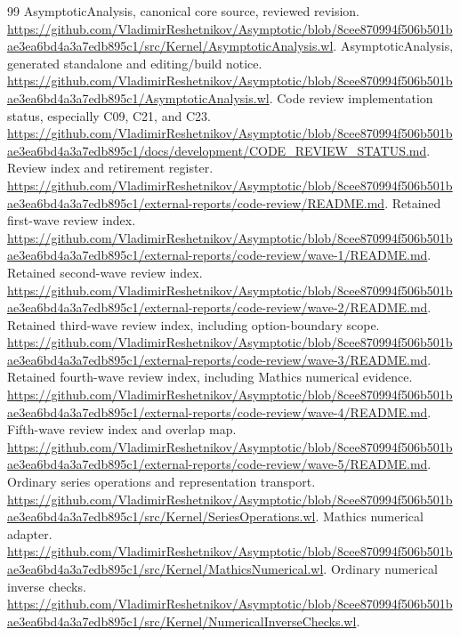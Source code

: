 \documentclass[11pt,letterpaper]{article}
\begin{document}
\begingroup
\small
\raggedright
\def\repoURL{https://github.com/VladimirReshetnikov/Asymptotic/blob/8cee870994f506b501bae3ea6bd4a3a7edb895c1/}
\begin{thebibliography}{99}
 AsymptoticAnalysis, canonical core source, reviewed revision. \url{https://github.com/VladimirReshetnikov/Asymptotic/blob/8cee870994f506b501bae3ea6bd4a3a7edb895c1/src/Kernel/AsymptoticAnalysis.wl}.
 AsymptoticAnalysis, generated standalone and editing/build notice. \url{https://github.com/VladimirReshetnikov/Asymptotic/blob/8cee870994f506b501bae3ea6bd4a3a7edb895c1/AsymptoticAnalysis.wl}.
 Code review implementation status, especially C09, C21, and C23. \url{https://github.com/VladimirReshetnikov/Asymptotic/blob/8cee870994f506b501bae3ea6bd4a3a7edb895c1/docs/development/CODE_REVIEW_STATUS.md}.
 Review index and retirement register. \url{https://github.com/VladimirReshetnikov/Asymptotic/blob/8cee870994f506b501bae3ea6bd4a3a7edb895c1/external-reports/code-review/README.md}.
 Retained first-wave review index. \url{https://github.com/VladimirReshetnikov/Asymptotic/blob/8cee870994f506b501bae3ea6bd4a3a7edb895c1/external-reports/code-review/wave-1/README.md}.
 Retained second-wave review index. \url{https://github.com/VladimirReshetnikov/Asymptotic/blob/8cee870994f506b501bae3ea6bd4a3a7edb895c1/external-reports/code-review/wave-2/README.md}.
 Retained third-wave review index, including option-boundary scope. \url{https://github.com/VladimirReshetnikov/Asymptotic/blob/8cee870994f506b501bae3ea6bd4a3a7edb895c1/external-reports/code-review/wave-3/README.md}.
 Retained fourth-wave review index, including Mathics numerical evidence. \url{https://github.com/VladimirReshetnikov/Asymptotic/blob/8cee870994f506b501bae3ea6bd4a3a7edb895c1/external-reports/code-review/wave-4/README.md}.
 Fifth-wave review index and overlap map. \url{https://github.com/VladimirReshetnikov/Asymptotic/blob/8cee870994f506b501bae3ea6bd4a3a7edb895c1/external-reports/code-review/wave-5/README.md}.
 Ordinary series operations and representation transport. \url{https://github.com/VladimirReshetnikov/Asymptotic/blob/8cee870994f506b501bae3ea6bd4a3a7edb895c1/src/Kernel/SeriesOperations.wl}.
 Mathics numerical adapter. \url{https://github.com/VladimirReshetnikov/Asymptotic/blob/8cee870994f506b501bae3ea6bd4a3a7edb895c1/src/Kernel/MathicsNumerical.wl}.
 Ordinary numerical inverse checks. \url{https://github.com/VladimirReshetnikov/Asymptotic/blob/8cee870994f506b501bae3ea6bd4a3a7edb895c1/src/Kernel/NumericalInverseChecks.wl}.

\end{thebibliography}
\end{document}
